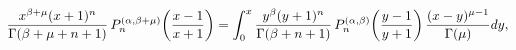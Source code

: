 \[\frac{x^{\beta+\mu}(x+1)^{n}}{\mathop{\Gamma\/}\nolimits\!\left(\beta+\mu+n+1%
\right)}\mathop{P^{(\alpha,\beta+\mu)}_{n}\/}\nolimits\!\left(\frac{x-1}{x+1}%
\right)=\int_{0}^{x}\frac{y^{\beta}(y+1)^{n}}{\mathop{\Gamma\/}\nolimits\!%
\left(\beta+n+1\right)}\mathop{P^{(\alpha,\beta)}_{n}\/}\nolimits\!\left(\frac%
{y-1}{y+1}\right)\*\frac{(x-y)^{\mu-1}}{\mathop{\Gamma\/}\nolimits\!\left(\mu%
\right)}dy,\]